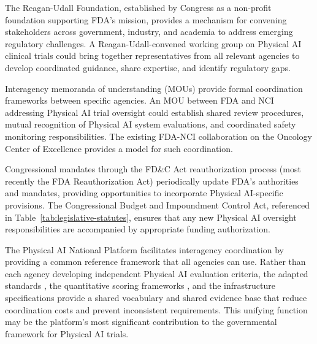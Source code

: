 The Reagan-Udall Foundation, established by Congress as a non-profit
foundation supporting FDA's mission, provides a mechanism for convening
stakeholders across government, industry, and academia to address emerging
regulatory challenges. A Reagan-Udall-convened working group on Physical AI
clinical trials could bring together representatives from all relevant
agencies to develop coordinated guidance, share expertise, and identify
regulatory gaps.

Interagency memoranda of understanding (MOUs) provide formal coordination
frameworks between specific agencies. An MOU between FDA and NCI addressing
Physical AI trial oversight could establish shared review procedures, mutual
recognition of Physical AI system evaluations, and coordinated safety
monitoring responsibilities. The existing FDA-NCI collaboration on the
Oncology Center of Excellence \cite{fda-oncology-guidance} provides a model
for such coordination.

Congressional mandates through the FD\&C Act reauthorization process (most
recently the FDA Reauthorization Act) periodically update FDA's authorities
and mandates, providing opportunities to incorporate Physical AI-specific
provisions. The Congressional Budget and Impoundment Control Act, referenced
in Table~\ref{tab:legislative-statutes}, ensures that any new Physical AI
oversight responsibilities are accompanied by appropriate funding
authorization.

The Physical AI National Platform facilitates interagency coordination by
providing a common reference framework that all agencies can use. Rather than
each agency developing independent Physical AI evaluation criteria, the
adapted standards \cite{ich-adapt, cfr50-adapt, cfr312-adapt}, the
quantitative scoring frameworks \cite{usl-standard}, and the infrastructure
specifications \cite{national-mcp-paper, fl-paper} provide a shared
vocabulary and shared evidence base that reduce coordination costs and
prevent inconsistent requirements. This unifying function may be the
platform's most significant contribution to the governmental framework for
Physical AI trials.

